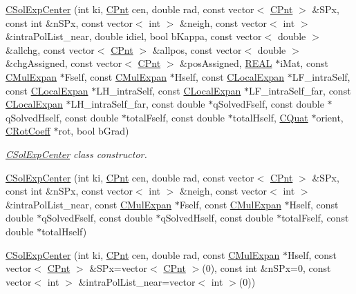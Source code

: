\begin{DoxyCompactItemize}
\hyperlink{classCSolExpCenter_a5ef36bcf68fa30133becd9c25803f2b0}{C\-Sol\-Exp\-Center} (int ki, \hyperlink{classCPnt}{C\-Pnt} cen, double rad, const vector$<$ \hyperlink{classCPnt}{C\-Pnt} $>$ \&S\-Px, const int \&n\-S\-Px, const vector$<$ int $>$ \&neigh, const vector$<$ int $>$ \&intra\-Pol\-List\-\_\-near, double idiel, bool b\-Kappa, const vector$<$ double $>$ \&allchg, const vector$<$ \hyperlink{classCPnt}{C\-Pnt} $>$ \&allpos, const vector$<$ double $>$ \&chg\-Assigned, const vector$<$ \hyperlink{classCPnt}{C\-Pnt} $>$ \&pos\-Assigned, \hyperlink{util_8h_a5821460e95a0800cf9f24c38915cbbde}{R\-E\-A\-L} $\ast$i\-Mat, const \hyperlink{classCMulExpan}{C\-Mul\-Expan} $\ast$Fself, const \hyperlink{classCMulExpan}{C\-Mul\-Expan} $\ast$Hself, const \hyperlink{classCLocalExpan}{C\-Local\-Expan} $\ast$L\-F\-\_\-intra\-Self, const \hyperlink{classCLocalExpan}{C\-Local\-Expan} $\ast$L\-H\-\_\-intra\-Self, const \hyperlink{classCLocalExpan}{C\-Local\-Expan} $\ast$L\-F\-\_\-intra\-Self\-\_\-far, const \hyperlink{classCLocalExpan}{C\-Local\-Expan} $\ast$L\-H\-\_\-intra\-Self\-\_\-far, const double $\ast$q\-Solved\-Fself, const double $\ast$q\-Solved\-Hself, const double $\ast$total\-Fself, const double $\ast$total\-Hself, \hyperlink{classCQuat}{C\-Quat} $\ast$orient, \hyperlink{classCRotCoeff}{C\-Rot\-Coeff} $\ast$rot, bool b\-Grad)
\begin{DoxyCompactList}\small\item\em \hyperlink{classCSolExpCenter}{C\-Sol\-Exp\-Center} class constructor. \end{DoxyCompactList}\item 
\hyperlink{classCSolExpCenter_a3900c52290f78ddb0338142d45ae6f1a}{C\-Sol\-Exp\-Center} (int ki, \hyperlink{classCPnt}{C\-Pnt} cen, double rad, const vector$<$ \hyperlink{classCPnt}{C\-Pnt} $>$ \&S\-Px, const int \&n\-S\-Px, const vector$<$ int $>$ \&neigh, const vector$<$ int $>$ \&intra\-Pol\-List\-\_\-near, const \hyperlink{classCMulExpan}{C\-Mul\-Expan} $\ast$Fself, const \hyperlink{classCMulExpan}{C\-Mul\-Expan} $\ast$Hself, const double $\ast$q\-Solved\-Fself, const double $\ast$q\-Solved\-Hself, const double $\ast$total\-Fself, const double $\ast$total\-Hself)
\item 
\hyperlink{classCSolExpCenter_a9a9956cff337b4a4f05ab820592da34f}{C\-Sol\-Exp\-Center} (int ki, \hyperlink{classCPnt}{C\-Pnt} cen, double rad, const \hyperlink{classCMulExpan}{C\-Mul\-Expan} $\ast$Hself, const vector$<$ \hyperlink{classCPnt}{C\-Pnt} $>$ \&S\-Px=vector$<$ \hyperlink{classCPnt}{C\-Pnt} $>$(0), const int \&n\-S\-Px=0, const vector$<$ int $>$ \&intra\-Pol\-List\-\_\-near=vector$<$ int $>$(0))

\end{DoxyCompactItemize}
